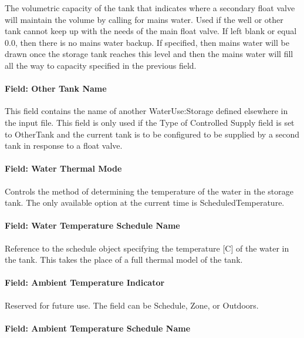 The volumetric capacity of the tank that indicates where a secondary float valve will maintain the volume by calling for mains water. Used if the well or other tank cannot keep up with the needs of the main float valve. If left blank or equal 0.0, then there is no mains water backup. If specified, then mains water will be drawn once the storage tank reaches this level and then the mains water will fill all the way to capacity specified in the previous field.

\paragraph{Field: Other Tank Name}\label{field-other-tank-name}

This field contains the name of another WaterUse:Storage defined elsewhere in the input file. This field is only used if the Type of Controlled Supply field is set to OtherTank and the current tank is to be configured to be supplied by a second tank in response to a float valve.

\paragraph{Field: Water Thermal Mode}\label{field-water-thermal-mode}

Controls the method of determining the temperature of the water in the storage tank. The only available option at the current time is ScheduledTemperature.

\paragraph{Field: Water Temperature Schedule Name}\label{field-water-temperature-schedule-name-000}

Reference to the schedule object specifying the temperature {[}C{]} of the water in the tank. This takes the place of a full thermal model of the tank.

\paragraph{Field: Ambient Temperature Indicator}\label{field-ambient-temperature-indicator-001}

Reserved for future use. The field can be Schedule, Zone, or Outdoors.

\paragraph{Field: Ambient Temperature Schedule Name}\label{field-ambient-temperature-schedule-name-002}

